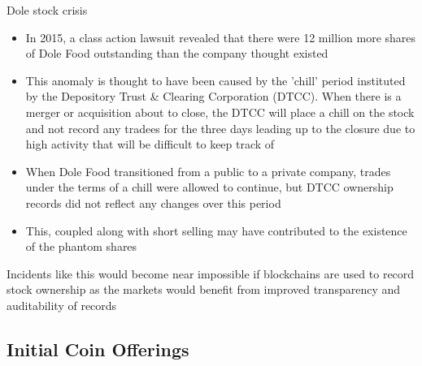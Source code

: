 \documentclass[10pt]{beamer}
\begin{document}


\begin{frame}{Dole stock crisis}
	\begin{itemize}
		\item In 2015, a class action lawsuit revealed that there were 12 million more shares of Dole Food outstanding than the company thought existed
		\item This anomaly is thought to have been caused by the 'chill' period instituted by the Depository Trust \& Clearing Corporation (DTCC). When there is a merger or acquisition about to close, the DTCC will place a chill on the stock and not record any tradees for the three days leading up to the closure due to high activity that will be difficult to keep track of
		\item When Dole Food transitioned from a public to a private company, trades under the terms of a chill were allowed to continue, but DTCC ownership records did not reflect any changes over this period
		\item This, coupled along with short selling may have contributed to the existence of the phantom shares
	\end{itemize}
	Incidents like this would become near impossible if blockchains are used to record stock ownership as the markets would benefit from improved transparency and auditability of records
\end{frame}



\subsection{Initial Coin Offerings}

\end{document}
